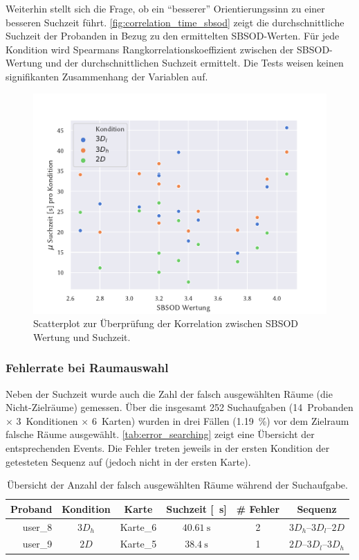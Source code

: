 Weiterhin stellt sich die Frage, ob ein \enquote{besserer} Orientierungssinn zu einer besseren Suchzeit führt.
\autoref{fig:correlation_time_sbsod} zeigt die durchschnittliche Suchzeit der Probanden in Bezug zu den ermittelten SBSOD-Werten.
Für jede Kondition wird Spearmans Rangkorrelationskoeffizient zwischen der SBSOD-Wertung und der durchschnittlichen Suchzeit ermittelt.
Die Tests weisen keinen signifikanten Zusammenhang der Variablen auf.
\begin{figure}[ht]
    \centering
    \includegraphics[width=\linewidth]{figures/analysis/correlation_time_sbsod_scatter}
    \caption{Scatterplot zur Überprüfung der Korrelation zwischen SBSOD Wertung und Suchzeit.}
    \label{fig:correlation_time_sbsod}
\end{figure}

\subsubsection*{Fehlerrate bei Raumauswahl}
Neben der Suchzeit wurde auch die Zahl der falsch ausgewählten Räume (die Nicht-Zielräume) gemessen.
Über die insgesamt 252 Suchaufgaben (14~Probanden $\times$ 3~Konditionen $\times$ 6~Karten) wurden in drei Fällen (\SI{1,19}{\percent}) vor dem Zielraum falsche Räume ausgewählt.
\autoref{tab:error_searching} zeigt eine Übersicht der entsprechenden Events.
Die Fehler treten jeweils in der ersten Kondition der getesteten Sequenz auf (jedoch nicht in der ersten Karte).
\begin{table}
    \centering
    \caption{Übersicht der Anzahl der falsch ausgewählten Räume während der Suchaufgabe.}
    \label{tab:error_searching}
    \begin{tabular}{rccccc}\toprule
        Proband                  & Kondition               & Karte    & Suchzeit [\SI{}{\second}] & \# Fehler & Sequenz  \\\midrule
        user\_8                  & $3D_h$                  & Karte\_6 & $\SI{40,61}{\second}$     & 2         & $3D_h$--$3D_l$--$2D$ \\
        user\_9                  & $2D$                    & Karte\_5 & $\SI{38,4}{\second}$      & 1         & $2D$--$3D_l$--$3D_h$ \\\bottomrule
    \end{tabular}
\end{table}

